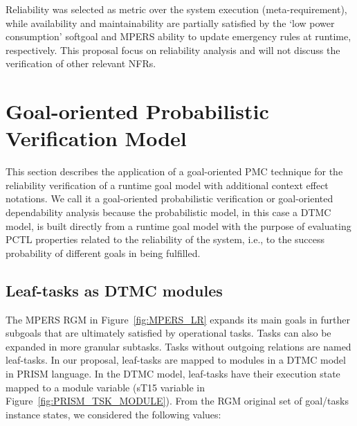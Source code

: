 Reliability was selected as metric over the system execution (meta-requirement), while availability and maintainability are partially satisfied by the `low power consumption' softgoal and MPERS ability to update emergency rules at runtime, respectively. This proposal focus on reliability analysis and will not discuss the verification of other relevant NFRs.


\section{Goal-oriented Probabilistic Verification Model}\label{ssec:NFR-verification}


This section describes the application of a goal-oriented PMC technique for the reliability verification of a runtime goal model with additional context effect notations. We call it a goal-oriented probabilistic verification or goal-oriented dependability analysis because the probabilistic model, in this case a DTMC model, is built directly from a runtime goal model with the purpose of evaluating PCTL properties related to the reliability of the system, i.e., to the success probability of different goals in being fulfilled.


\subsection{Leaf-tasks as DTMC modules}


The MPERS RGM in Figure~\ref{fig:MPERS_LR} expands its main goals in further subgoals that are ultimately satisfied by operational tasks. Tasks can also be expanded in more granular subtasks. Tasks without outgoing relations are named leaf-tasks. In our proposal, leaf-tasks are mapped to modules in a DTMC model in PRISM language. In the DTMC model, leaf-tasks have their execution state mapped to a module variable (sT15 variable in Figure~\ref{fig:PRISM_TSK_MODULE}). From the RGM original set of goal/tasks instance states, we considered the following values:


